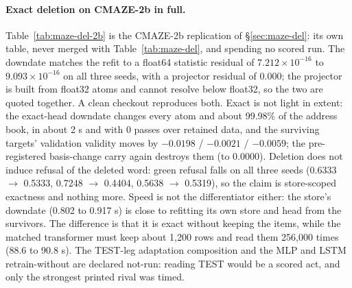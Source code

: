 \documentclass{article} %
\newcommand{\sci}[2]{\ensuremath{#1\times10^{#2}}}
\begin{document}
\paragraph{Exact deletion on CMAZE-2b in full.} Table~\ref{tab:maze-del-2b} is the CMAZE-2b
replication of \S\ref{sec:maze-del}: its own table, never merged with Table~\ref{tab:maze-del}, and
spending no scored run.
The downdate matches the refit to a float64 statistic residual of \sci{7.212}{-16} to
\sci{9.093}{-16} on all three seeds, with a projector residual of 0.000; the projector is built
from float32 atoms and cannot resolve below float32, so the two are quoted together. A clean
checkout reproduces both. Exact is not light in extent: the exact-head downdate changes every atom
and about 99.98\% of the address book, in about 2 s and with 0 passes over retained data, and the
surviving targets' validation validity moves by $-0.0198$ / $-0.0021$ / $-0.0059$; the
pre-registered basis-change carry again destroys them (to 0.0000). Deletion does not induce refusal
of the deleted word: green refusal falls on all three seeds (0.6333 $\to$ 0.5333, 0.7248 $\to$
0.4404, 0.5638 $\to$ 0.5319), so the claim is store-scoped exactness and nothing more. Speed is not
the differentiator either: the store's downdate (0.802 to 0.917 s) is close to refitting its own
store and head from the survivors. The difference is that it is exact without keeping the items,
while the matched transformer must keep about 1,200 rows and read them 256,000 times (88.6 to
90.8 s). The TEST-leg adaptation composition and the MLP and LSTM retrain-without are declared
not-run: reading TEST would be a scored act, and only the strongest printed rival was timed.
\end{document}
